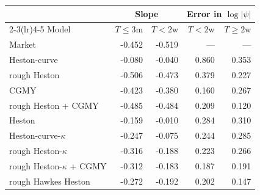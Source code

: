 \begin{tabular}{lrrrr}
\toprule
 & \multicolumn{2}{c}{Slope} & \multicolumn{2}{c}{Error in $\log|\psi|$}\\
\cmidrule(lr){2-3}\cmidrule(lr){4-5}
Model & $T\le 3$m & $T<2$w & $T<2$w & $T\ge 2$w\\
\midrule
Market & -0.452 & -0.519 & --- & ---\\
\addlinespace
Heston-curve & -0.080 & -0.040 & 0.860 & 0.353\\
rough Heston & -0.506 & -0.473 & 0.379 & 0.227\\
CGMY & -0.423 & -0.380 & 0.160 & 0.267\\
rough Heston + CGMY & -0.485 & -0.484 & 0.209 & 0.120\\
\addlinespace
Heston & -0.159 & -0.010 & 0.284 & 0.310\\
Heston-curve-$\kappa$ & -0.247 & -0.075 & 0.244 & 0.285\\
rough Heston-$\kappa$ & -0.316 & -0.188 & 0.223 & 0.266\\
rough Heston-$\kappa$ + CGMY & -0.312 & -0.183 & 0.187 & 0.191\\
rough Hawkes Heston & -0.272 & -0.192 & 0.202 & 0.147\\
\bottomrule
\end{tabular}
